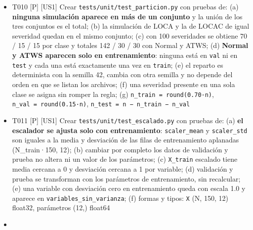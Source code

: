 \documentclass[12pt,a4paper]{article}
\providecommand{\tightlist}{\setlength{\itemsep}{0pt}\setlength{\parskip}{0pt}}
\newenvironment{documentogenerado}[2]{%
  \def\doccomando{#1}\def\docruta{#2}%
  \par\begingroup\small\setstretch{1.15}\sloppy%
}{\endgroup\par\medskip}
\begin{document}
\begin{documentogenerado}{/speckit-tasks (fase 7: /speckit-converge)}{specs\slash 001-preparacion-datos\slash tasks.md}
\begin{itemize}
\tightlist
\item[$\boxtimes$]
  T010 {[}P{]} {[}US1{]} Crear \texttt{tests/\allowbreak{}unit/\allowbreak{}test\_\allowbreak{}particion.\allowbreak{}py} con pruebas de: (a) \textbf{ninguna simulación aparece en más de un conjunto} y la unión de los tres conjuntos es el total; (b) la simulación de LOCA y la de LOCAC de igual severidad quedan en el mismo conjunto; (c) con 100 severidades se obtiene 70 / 15 / 15 por clase y totales 142 / 30 / 30 con Normal y ATWS; (d) \textbf{Normal y ATWS aparecen solo en entrenamiento}: ninguna está en \texttt{val} ni en \texttt{test} y cada una está exactamente una vez en \texttt{train}; (e) el reparto es determinista con la semilla 42, cambia con otra semilla y no depende del orden en que se listan los archivos; (f) una severidad presente en una sola clase se asigna sin romper la regla; (g) \texttt{n\_\allowbreak{}train\ =\allowbreak{}\ round(0.\allowbreak{}70·n)}, \texttt{n\_\allowbreak{}val\ =\allowbreak{}\ round(0.\allowbreak{}15·n)}, \texttt{n\_\allowbreak{}test\ =\allowbreak{}\ n\ −\ n\_\allowbreak{}train\ −\ n\_\allowbreak{}val}
\item[$\boxtimes$]
  T011 {[}P{]} {[}US1{]} Crear \texttt{tests/\allowbreak{}unit/\allowbreak{}test\_\allowbreak{}escalado.\allowbreak{}py} con pruebas de: (a) \textbf{el escalador se ajusta solo con entrenamiento}: \texttt{scaler\_\allowbreak{}mean} y \texttt{scaler\_\allowbreak{}std} son iguales a la media y desviación de las filas de entrenamiento aplanadas (N\_train·150, 12); (b) cambiar por completo los datos de validación y prueba no altera ni un valor de los parámetros; (c) \texttt{X\_\allowbreak{}train} escalado tiene media cercana a 0 y desviación cercana a 1 por variable; (d) validación y prueba se transforman con los parámetros de entrenamiento, sin recalcular; (e) una variable con desviación cero en entrenamiento queda con escala 1.0 y aparece en \texttt{variables\_\allowbreak{}sin\_\allowbreak{}varianza}; (f) formas y tipos: \texttt{X} (N, 150, 12) float32, parámetros (12,) float64
\item[$\boxtimes$]

\end{itemize}
\end{documentogenerado}
\end{document}
